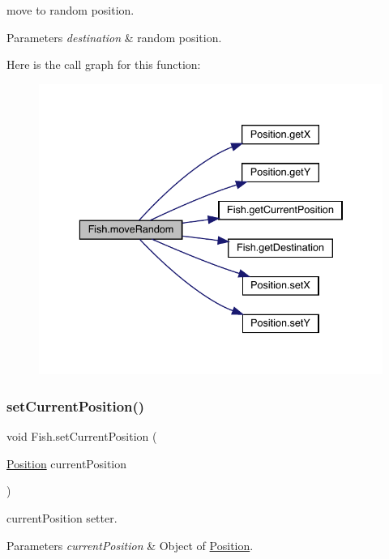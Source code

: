 move to random position. 
\begin{DoxyParams}{Parameters}
{\em destination} & random position. \\
\hline
\end{DoxyParams}
Here is the call graph for this function\+:
\nopagebreak
\begin{figure}[H]
\begin{center}
\leavevmode
\includegraphics[width=336pt]{class_fish_aa3683716f71b574717c30f0f7be3ec33_cgraph}
\end{center}
\end{figure}
\mbox{\label{class_fish_ab86ec00d2b503f310f1c29bc9a94fbd7}} 
\subsubsection{\texorpdfstring{set\+Current\+Position()}{setCurrentPosition()}}
{\footnotesize\ttfamily void Fish.\+set\+Current\+Position (\begin{DoxyParamCaption}\item[{\mbox{\hyperlink{class_position}{Position}}}]{current\+Position }\end{DoxyParamCaption})\hspace{0.3cm}{\ttfamily [inline]}}

current\+Position setter. 
\begin{DoxyParams}{Parameters}
{\em current\+Position} & Object of \mbox{\hyperlink{class_position}{Position}}. \\
\hline
\end{DoxyParams}
\mbox{\label{class_fish_a9b74ce69e55149c7df9f70e83ce5b66b}} 

